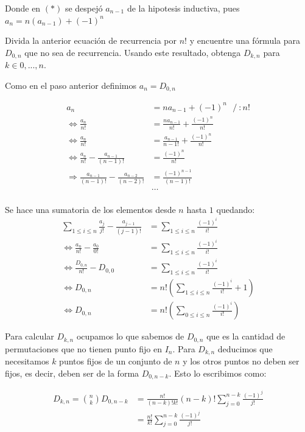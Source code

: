 \documentclass[letterpaper,10pt,table, dvipsnames]{article}
\begin{document}
Donde en $(*)$ se despejó $a_{n-1}$ de la hipotesis inductiva, pues $a_{n}=n(a_{n-1}) + (-1)^n$

\begin{tcolorbox}
 Divida la anterior ecuación de recurrencia por $n!$ y encuentre una fórmula para $D_{0,n}$ que no sea de recurrencia. Usando este resultado, obtenga $D_{k,n}$ para $k \in {0,...,n}$.
\end{tcolorbox}

Como en el paso anterior definimos $a_n=D_{0,n} $

\begin{align*}
a_{n} &= na_{n-1} + (-1)^n \ \ \ /\ :n! \\
\Leftrightarrow \frac{a_n}{n!} &= \frac{na_{n-1}}{n!} + \frac{(-1)^n}{n!}  \\
\Leftrightarrow \frac{a_n}{n!} &= \frac{a_{n-1}}{n-1!} + \frac{(-1)^n}{n!} \\
\Leftrightarrow \frac{a_n}{n!} - \frac{a_{n-1}}{(n-1)!} &= \frac{(-1)^n}{n!} \\
\Rightarrow \frac{a_{n-1}}{(n-1)!} - \frac{a_{n-2}}{(n-2)!} &= \frac{(-1)^{n-1}}{(n-1)!} \\
&\ldots \\
\end{align*}

Se hace una sumatoria de los elementos desde $n$ hasta $1$ quedando:
\begin{align*}
\sum_{1\leq i \leq n}^{} \frac{a_j}{j!} - \frac{a_{j-1}}{(j-1)!} &= \sum_{1\leq i \leq n}^{} \frac{(-1)^i}{i!} \\
\Leftrightarrow \frac{a_n}{n!} - \frac{a_0}{0!} &= \sum_{1\leq i \leq n}^{} \frac{(-1)^i}{i!} \\
\Leftrightarrow \frac{D_{0,n}}{n!} - D_{0,0} &= \sum_{1\leq i \leq n}^{} \frac{(-1)^i}{i!} \\
\Leftrightarrow D_{0,n} &= n! \left(\sum_{1\leq i \leq n} \frac{(-1)^i}{i!} + 1 \right) \\
\Leftrightarrow D_{0,n} &= n! \left(\sum_{0\leq i \leq n} \frac{(-1)^i}{i!} \right)
\end{align*}

Para calcular $D_{k,n}$ ocupamos lo que sabemos de $D_{0,n} $ que es la cantidad de permutaciones que no tienen punto fijo en $I_n $. Para $D_{k,n}$ deducimos que necesitamos $k$ puntos fijos de un conjunto de $n$ y los otros puntos no deben ser fijos, es decir, deben ser de la forma $D_{0,n-k} $. Esto lo escribimos como:

\begin{align*}
     D_{k,n}=\binom{n}{k}D_{0,n-k} &= \frac{n!}{(n-k)! k!} (n-k)! \sum_{j=0}^{n-k} \frac{(-1)^j}{j!} \\
     &= \frac{n!}{k!} \sum_{j=0}^{n-k} \frac{(-1)^j}{j!}
 \end{align*}
\end{document}
